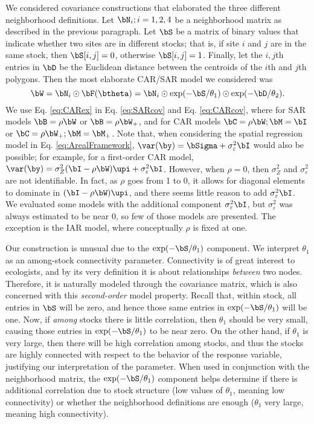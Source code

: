 We considered covariance constructions that elaborated the three different neighborhood definitions.  Let $\bN_i; i = 1,2,4$ be a neighborhood matrix as described in the previous paragraph.  Let $\bS$ be a matrix of binary values that indicate whether two sites are in different stocks; that is, if site $i$ and $j$ are in the same stock, then $\bS[i,j] = 0$, otherwise $\bS[i,j] = 1$.  Finally, let the $i,j$th entries in $\bD$ be the Euclidean distance between the centroids of the $i$th and $j$th polygons.  Then the most elaborate CAR/SAR model we considered was
\begin{equation} \label{eq:CARex}
	\bW = \bN_i \odot \bF(\btheta) = \bN_i \odot \exp(-\bS/\theta_1) \odot \exp(-\bD/\theta_2).
\end{equation}
We use Eq. \ref{eq:CARex} in Eq. \ref{eq:SARcov} and Eq. \ref{eq:CARcov}, where for SAR models $\bB = \rho\bW$ or $\bB = \rho\bW_+$, and for CAR models $\bC = \rho\bW; \bM = \bI$ or $\bC = \rho\bW_+; \bM = \bM_+$. Note that, when considering the spatial regression model in Eq. \ref{eq:ArealFramework}, $\var(\by) = \bSigma + \sigma^2_\varepsilon\bI$ would also be possible; for example, for a first-order CAR model, $\var(\by) = \sigma_Z^2(\bI - \rho\bW)\upi + \sigma^2_\varepsilon\bI$.  However, when $\rho=0$, then $\sigma_Z^2$ and $\sigma^2_\varepsilon$ are not identifiable. In fact, as $\rho$ goes from 1 to 0, it allows for diagonal elements to dominate in $(\bI - \rho\bW)\upi$, and there seems little reason to add $\sigma^2_\varepsilon\bI$.  We evaluated some models with the additional component $\sigma^2_\varepsilon\bI$, but $\sigma^2_\varepsilon$ was always estimated to be near 0, so few of those models are presented.  The exception is the IAR model, where conceptually $\rho$ is fixed at one.

Our construction is unusual due to the $\exp(-\bS/\theta_1)$ component.  We interpret $\theta_1$ as an among-stock connectivity parameter.  Connectivity is of great interest to ecologists, and by its very definition it is about relationships \emph{between} two nodes.  Therefore, it is naturally modeled through the covariance matrix, which is also concerned with this \emph{second-order} model property.  Recall that, within stock, all entries in $\bS$ will be zero, and hence those same entries in $\exp(-\bS/\theta_1)$ will be one.  Now, if \emph{among} stocks there is little correlation, then $\theta_1$ should be very small, causing those entries in $\exp(-\bS/\theta_1)$ to be near zero.  On the  other hand, if $\theta_1$ is very large, then there will be high correlation among stocks, and thus the stocks are highly connected with respect to the behavior of the response variable, justifying our interpretation of the parameter.  When used in conjunction with the neighborhood matrix, the $\exp(-\bS/\theta_1)$ component helps determine if there is additional correlation due to stock structure (low values of $\theta_1$, meaning low connectivity) or whether the neighborhood definitions are enough ($\theta_1$ very large, meaning high connectivity).

